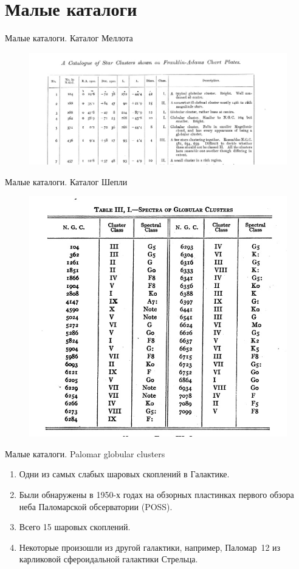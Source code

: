 \documentclass{beamer}
\begin{document}
    \section{Малые каталоги}
    \begin{frame}{Малые каталоги. Каталог Меллота}
        \begin{figure}[h]
            \centering
            \includegraphics[width=0.9\linewidth]{pictures/Mellot.jpg}
        \end{figure}
    \end{frame}
    \begin{frame}{Малые каталоги. Каталог Шепли}
        \begin{figure}[h]
            \centering
            \includegraphics[width=0.7\linewidth]{pictures/Shapley.jpg}
        \end{figure}
    \end{frame}
    \begin{frame}{Малые каталоги. Palomar globular clusters}
        \begin{enumerate}[]
            \item Одни из самых слабых шаровых скоплений в Галактике.
            \item Были обнаружены в 1950-х годах на обзорных пластинках первого обзора неба Паломарской обсерватории (POSS).
            \item Всего 15 шаровых скоплений.
            \item Некоторые произошли из другой галактики, например, Паломар~12 из карликовой сфероидальной галактики Стрельца.
        \end{enumerate}
    \end{frame}
\end{document}
